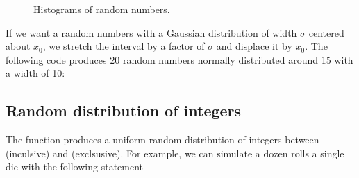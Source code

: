 \documentclass[letterpaper,10pt,english]{sphinxmanual}
\begin{document}
\begin{figure}[htbp]
\centering
\capstart

\noindent{}
\caption{Histograms of random numbers.}\label{\detokenize{chap3/chap3_arrays:id1}}\label{\detokenize{chap3/chap3_arrays:fig-randhistos}}\end{figure}

\sphinxAtStartPar
If we want a random numbers with a Gaussian distribution of width \(\sigma\) centered about \(x_0\), we stretch the interval by a factor of \(\sigma\) and displace it by \(x_0\).  The following code produces 20 random numbers normally distributed around 15 with a width of 10:

\begin{sphinxVerbatim}[commandchars=\\\{\},numbers=left,firstnumber=1,stepnumber=1]
    

  
\PYG{p}{[}     
\PYG{g+go}{                31.19120157, 26.24254326])}
\end{sphinxVerbatim}


\subsection{Random distribution of integers}
\label{\detokenize{chap3/chap3_arrays:random-distribution-of-integers}}
\sphinxAtStartPar
The function  produces a uniform random distribution of  integers between  (inculsive) and  (exclsusive).  For example, we can simulate a dozen rolls a single die with the following statement

\begin{sphinxVerbatim}[commandchars=\\\{\}]
  
\PYG{p}{[}           \PYG{p}{]}
\end{sphinxVerbatim}
\end{document}
